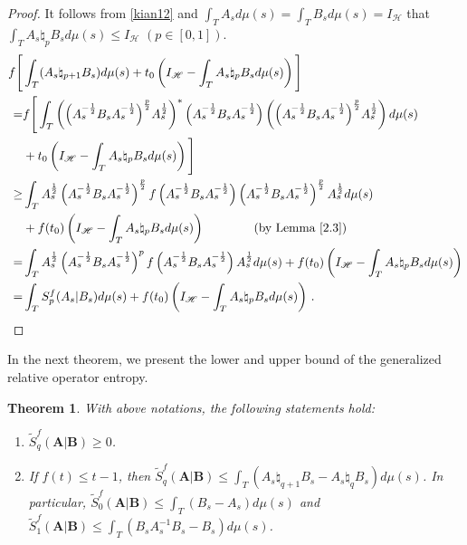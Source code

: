 \documentclass[12pt, reqno]{amsart}
\newtheorem{theorem}{Theorem}[section]
\theoremstyle{definition}
\theoremstyle{remark}
\numberwithin{equation}{section}
\begin{document}
\begin{proof}
It follows from \eqref{kian12} and $\int_TA_sd\mu(s)=\int_TB_sd\mu(s)=I_{\mathscr H}$ that $\int_TA_s \natural_{p} B_s d\mu(s)\le I_{\mathscr H}\,\,(p\in[0,1])$.
\begin{align*}
f\Bigg[&\int_T(A_s\natural_{p+1}B_s)d\mu(s)+t_0\left(I_{\mathscr H}-\int_TA_s\natural_pB_sd\mu(s)\right)\Bigg]\\
=&f\Bigg[\int_T\left(\Big(A_s^{-\frac{1}{2}}B_sA_s^{-\frac{1}{2}}\Big)^{\frac{p}{2}}A_s^{\frac{1}{2}}\right)^*
\Big(A_s^{-\frac{1}{2}}B_sA_s^{-\frac{1}{2}}\Big)\left(\Big(A_s^{-\frac{1}{2}}B_sA_s^{-\frac{1}{2}}\Big)^{\frac{p}{2}}A_s^{\frac{1}{2}}\right)d\mu(s)\\
&+t_0\left(I_{\mathscr H}-\int_TA_s\natural_p B_sd\mu(s)\right)\Bigg]\\
\ge &\int_TA_s^{\frac{1}{2}}\left(A_s^{-\frac{1}{2}}B_sA_s^{-\frac{1}{2}}\right)^{\frac{p}{2}}
f\left(A_s^{-\frac{1}{2}}B_sA_s^{-\frac{1}{2}}\right)\left(A_s^{-\frac{1}{2}}B_sA_s^{-\frac{1}{2}}\right)^{\frac{p}{2}}
A_s^{\frac{1}{2}}d\mu(s)\\
&+f(t_0)\left(I_{\mathscr H}-\int_TA_s\natural_pB_sd\mu(s)\right)\quad\quad\quad\quad\mbox{(by Lemma \ref{2.3})}\\
=&\int_TA_s^{\frac{1}{2}}\left(A_s^{-\frac{1}{2}}B_sA_s^{-\frac{1}{2}}\right)^p
f\left(A_s^{-\frac{1}{2}}B_sA_s^{-\frac{1}{2}}\right)A_s^{\frac{1}{2}}d\mu(s)+f(t_0)\left(I_{\mathscr H}-\int_TA_s\natural_pB_sd\mu(s)\right)\\
=&\int_T{S}_p^f(A_s|B_s)d\mu(s)+f(t_0)\left(I_{\mathscr H}-\int_TA_s\natural_pB_sd\mu(s)\right)\,.
\end{align*}
\end{proof}
In the next theorem, we present the lower and upper bound of the generalized relative operator entropy.
\begin{theorem}\label{t2}
With above notations, the following statements hold:
\begin{enumerate}
\item[(i)] $\widetilde{S}_q^f(\mathbf{A}|\mathbf{B}) \ge 0$.
\item[(ii)] If $f(t) \le t-1$, then $\widetilde{S}_q^f(\mathbf{A}|\mathbf{B}) \le \int_T(A_s\natural_{q+1} B_s-A_s\natural_q B_s)d\mu(s)$. In particular, $\widetilde{S}_0^f(\mathbf{A}|\mathbf{B}) \le \int_T(B_s-A_s)d\mu(s)$ and $\widetilde{S}_1^f(\mathbf{A}|\mathbf{B}) \le \int_T(B_sA_s^{-1}B_s-B_s)d\mu(s)$.
\end{enumerate}
\end{theorem}
\end{document}
